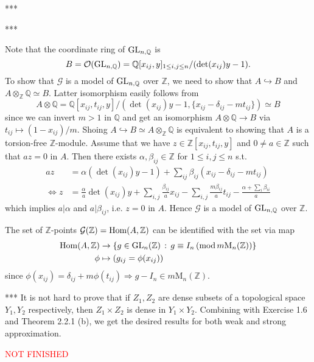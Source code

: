 \begin{problem} ***
\end{problem}
\begin{problem} ***
\end{problem}

\begin{problem}
Note that the coordinate ring of $\operatorname{\mathrm{GL}}_{n,\mathbb{Q}}$ is 
$$
B =\mathcal{O}(\operatorname{\mathrm{GL}}_{n, \mathbb{Q}}) = \mathbb{Q}[x_{ij}, y]_{1\leq i,j \leq n} / (\det(x_{ij})y - 1).
$$
To show that $\mathcal{G}$ is a model of $\operatorname{\mathrm{GL}}_{n, \mathbb{Q}}$ over $\mathbb{Z}$, we need to show that
$A \hookrightarrow B$ and $A \otimes_{\mathbb{Z}} \mathbb{Q} \simeq B$.
Latter isomorphism easily follows from 
$$
A \otimes \mathbb{Q} = \mathbb{Q}[x_{ij}, t_{ij}, y] / (\det(x_{ij})y - 1, \{x_{ij} - \delta_{ij} - mt_{ij}\}) \simeq B
$$
since we can invert $m > 1$ in $\mathbb{Q}$ and get an isomorphism $A\otimes\mathbb{Q} \to B$ via $t_{ij} \mapsto (1 - x_{ij})/m$.
Shoing $A \hookrightarrow B \simeq A \otimes_{\mathbb{Z}}\mathbb{Q}$ is equivalent to
showing that $A$ is a torsion-free $\mathbb{Z}$-module.
Assume that we have $z\in \mathbb{Z}[x_{ij}, t_{ij}, y]$ and $0 \neq a\in\mathbb{Z}$
such that $az = 0$ in $A$.
Then there exists $\alpha, \beta_{ij} \in \mathbb{Z}$ for $1 \leq i, j \leq n$ s.t.
\begin{align*}
az &= \alpha(\det(x_{ij})y - 1) + \sum_{ij}\beta_{ij}(x_{ij} - \delta_{ij} - mt_{ij}) \\
\Leftrightarrow z &= \frac{\alpha}{a} \det(x_{ij})y + \sum_{i, j} \frac{\beta_{ij}}{a}x_{ij} - \sum_{i, j} \frac{m\beta_{ij}}{a}t_{ij} - \frac{\alpha + \sum_{i}\beta_{ii}}{a}
\end{align*}
which implies $a |\alpha$ and $a|\beta_{ij}$, i.e. $z = 0$ in $A$.
Hence $\mathcal{G}$ is a model of $\operatorname{\mathrm{GL}}_{n,\mathbb{Q}}$ over $\mathbb{Z}$.

The set of $\mathbb{Z}$-points $\mathcal{G}(\mathbb{Z}) = \operatorname{\mathrm{Hom}}(A, \mathbb{Z})$ can be identified with the set via map
\begin{align*}
\operatorname{\mathrm{Hom}}(A, \mathbb{Z}) &\to \{g \in \operatorname{\mathrm{GL}}_{n}(\mathbb{Z})\,:\,g \equiv I_{n} \,(\mathrm{mod}\, m \mathrm{M}_{n}(\mathbb{Z}))\} \\
\phi &\mapsto (g_{ij} = \phi(x_{ij}))
\end{align*}
since $\phi(x_{ij}) = \delta_{ij} + m\phi(t_{ij}) \Rightarrow g - I_{n} \in m\mathrm{M}_{n}(\mathbb{Z})$.
\end{problem}

\begin{problem} ***
It is not hard to prove that if $Z_{1}, Z_{2}$ are dense subsets of a topological space $Y_{1}, Y_{2}$ respectively, then
$Z_{1} \times Z_{2}$ is dense in $Y_{1} \times Y_{2}$.
Combining with Exercise 1.6 and Theorem 2.2.1 (b), we get the desired results for both weak and strong approximation.

\textcolor{red}{NOT FINISHED}
\end{problem}


